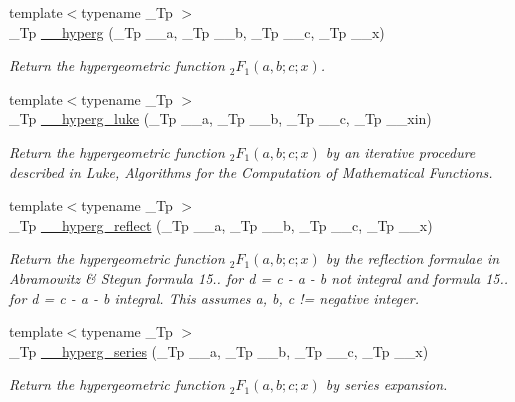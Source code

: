 \begin{DoxyCompactItemize}
\item 
{\footnotesize template$<$typename \+\_\+\+Tp $>$ }\\\+\_\+\+Tp \hyperlink{namespacestd_1_1____detail_a316589a60d5e5f50201c2d42b980678c}{\+\_\+\+\_\+hyperg} (\+\_\+\+Tp \+\_\+\+\_\+a, \+\_\+\+Tp \+\_\+\+\_\+b, \+\_\+\+Tp \+\_\+\+\_\+c, \+\_\+\+Tp \+\_\+\+\_\+x)
\begin{DoxyCompactList}\small\item\em Return the hypergeometric function $ {}_2F_1(a,b;c;x) $. \end{DoxyCompactList}\item 
{\footnotesize template$<$typename \+\_\+\+Tp $>$ }\\\+\_\+\+Tp \hyperlink{namespacestd_1_1____detail_a0c1ec62b5c39c93ad70a8229a7a6d84d}{\+\_\+\+\_\+hyperg\+\_\+luke} (\+\_\+\+Tp \+\_\+\+\_\+a, \+\_\+\+Tp \+\_\+\+\_\+b, \+\_\+\+Tp \+\_\+\+\_\+c, \+\_\+\+Tp \+\_\+\+\_\+xin)
\begin{DoxyCompactList}\small\item\em Return the hypergeometric function $ {}_2F_1(a,b;c;x) $ by an iterative procedure described in Luke, Algorithms for the Computation of Mathematical Functions. \end{DoxyCompactList}\item 
{\footnotesize template$<$typename \+\_\+\+Tp $>$ }\\\+\_\+\+Tp \hyperlink{namespacestd_1_1____detail_a3c3baddc93bfaf1cb368d4b74e53542d}{\+\_\+\+\_\+hyperg\+\_\+reflect} (\+\_\+\+Tp \+\_\+\+\_\+a, \+\_\+\+Tp \+\_\+\+\_\+b, \+\_\+\+Tp \+\_\+\+\_\+c, \+\_\+\+Tp \+\_\+\+\_\+x)
\begin{DoxyCompactList}\small\item\em Return the hypergeometric function $ {}_2F_1(a,b;c;x) $ by the reflection formulae in Abramowitz \& Stegun formula 15.. for d = c -\/ a -\/ b not integral and formula 15.. for d = c -\/ a -\/ b integral. This assumes a, b, c != negative integer. \end{DoxyCompactList}\item 
{\footnotesize template$<$typename \+\_\+\+Tp $>$ }\\\+\_\+\+Tp \hyperlink{namespacestd_1_1____detail_ad234e0d31f55cd3748169dccb2533c6a}{\+\_\+\+\_\+hyperg\+\_\+series} (\+\_\+\+Tp \+\_\+\+\_\+a, \+\_\+\+Tp \+\_\+\+\_\+b, \+\_\+\+Tp \+\_\+\+\_\+c, \+\_\+\+Tp \+\_\+\+\_\+x)
\begin{DoxyCompactList}\small\item\em Return the hypergeometric function $ {}_2F_1(a,b;c;x) $ by series expansion. \end{DoxyCompactList}\item 

\end{DoxyCompactItemize}
